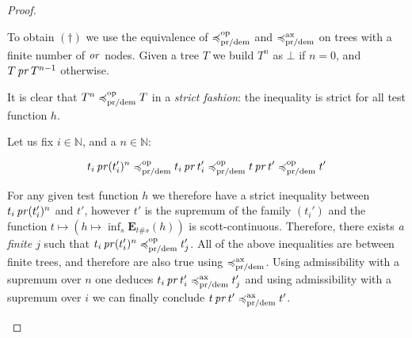 \begin{proof}
\begin{itemize}
\begin{description}
    To obtain $(\dagger)$ we use the equivalence of $\preccurlyeq^{\text{op}}_{\text{pr/dem}}$
    and $\preccurlyeq^{\text{ax}}_{\text{pr/dem}}$ on trees with a finite number of $\operatorname{\mathit{or}}$ nodes.
    Given a tree $T$ we build $T^n$ as $\bot$ if $n = 0$, and $T \operatorname{\mathit{pr}} T^{n-1}$
    otherwise. 

    It is clear that $T^n \preccurlyeq^{\text{op}}_{\text{pr/dem}} T$ in a \emph{strict fashion}:
    the inequality is strict for all test function $h$.

    Let us fix $i \in \mathbb{N}$, and a $n \in \mathbb{N}$: 

    \begin{equation*}
        t_i \operatorname{\mathit{pr}} (t_i')^n \preccurlyeq^{\text{op}}_{\text{pr/dem}} t_i \operatorname{\mathit{pr}} t_i'
        \preccurlyeq^{\text{op}}_{\text{pr/dem}} t \operatorname{\mathit{pr}} t' \preccurlyeq^{\text{op}}_{\text{pr/dem}} t'
    \end{equation*}

    For any given test function $h$ we therefore have a strict 
    inequality between $t_i \operatorname{\mathit{pr}} (t_i')^n$ and $t'$, however 
    $t'$ is the supremum of the family $(t_i')$ and the function 
    $ t \mapsto (h \mapsto \inf_s \mathbf{E}_{ t \# s} (h))$ is scott-continuous.
    Therefore, there exists \emph{a finite $j$} such that 
    $t_i \operatorname{\mathit{pr}} (t_i')^n \preccurlyeq^{\text{op}}_{\text{pr/dem}} t_j'$.
    All of the above inequalities are between finite trees, and 
    therefore are also true using $\preccurlyeq^{\text{ax}}_{\text{pr/dem}}$.
    Using admissibility with a supremum over $n$ 
    one deduces $t_i \operatorname{\mathit{pr}} t_i' \preccurlyeq^{\text{ax}}_{\text{pr/dem}} t_j'$
    and using admissibility with a supremum over $i$ we can finally conclude
    $t \operatorname{\mathit{pr}} t' \preccurlyeq^{\text{ax}}_{\text{pr/dem}} t'$.
    \end{description}
    \end{itemize}
    

\end{proof}

